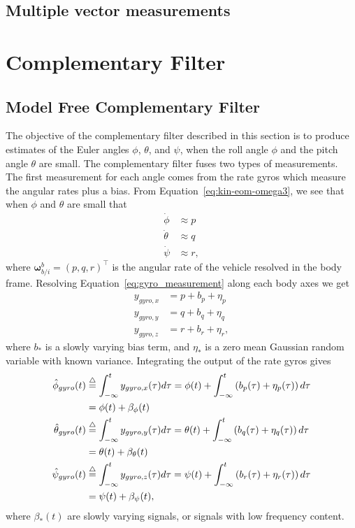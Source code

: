 \subsection{Multiple vector measurements}




\section{Complementary Filter}

\subsection{Model Free Complementary Filter}

The objective of the complementary filter described in this section is to produce estimates of the Euler angles $\phi$, $\theta$, and $\psi$, when the roll angle $\phi$ and the pitch angle $\theta$ are small.  The complementary filter fuses two types of measurements.  The first measurement for each angle comes from the rate gyros which measure the angular rates plus a bias.  From Equation~\eqref{eq:kin-eom-omega3}, we see that when $\phi$ and $\theta$ are small that
\begin{align*}
\dot{\phi} &\approx p \\
\dot{\theta} &\approx q \\
\dot{\psi} &\approx r,
\end{align*}
where $\boldsymbol{\omega}_{b/i}^b = (p, q, r)^\top$ is the angular rate of the vehicle resolved in the body frame.  Resolving Equation~\eqref{eq:gyro_measurement} along each body axes we get
\begin{align*}
y_{gyro,x} &= p + b_p + \eta_p \\	
y_{gyro,y} &= q + b_q + \eta_q \\	
y_{gyro,z} &= r + b_r + \eta_r,	
\end{align*}
where $b_\ast$ is a slowly varying bias term, and $\eta_\ast$ is a zero mean Gaussian random variable with known variance.  Integrating the output of the rate gyros gives
\begin{align*}
\hat{\phi}_{gyro}(t) &\stackrel{\triangle}{=} \int_{-\infty}^t y_{gyro,x}(\tau)d\tau = \phi(t) + \int_{-\infty}^t \left(b_p(\tau) + \eta_p(\tau)\right)d\tau \\
	&= \phi(t) + \beta_\phi(t)	\\
\hat{\theta}_{gyro}(t) &\stackrel{\triangle}{=} \int_{-\infty}^t y_{gyro,y}(\tau)d\tau = \theta(t) + \int_{-\infty}^t \left(b_q(\tau) + \eta_q(\tau)\right)d\tau \\
	&= \theta(t) + \beta_\theta(t)	\\
\hat{\psi}_{gyro}(t) &\stackrel{\triangle}{=} \int_{-\infty}^t y_{gyro,z}(\tau)d\tau = \psi(t) + \int_{-\infty}^t \left(b_r(\tau) + \eta_r(\tau)\right)d\tau \\
	&= \psi(t) + \beta_\psi(t),	
\end{align*}
where $\beta_\ast(t)$ are slowly varying signals, or signals with low frequency content.

